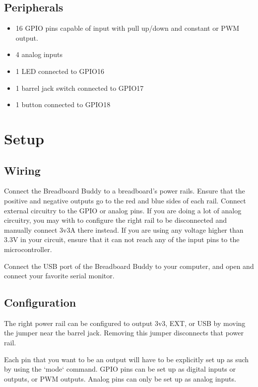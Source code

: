 \documentclass[12pt,letterpaper]{article}
\begin{document}
\subsection{Peripherals}
\begin{itemize}
    \item 16 GPIO pins capable of input with pull up/down and constant or PWM output.
    \item 4 analog inputs
    \item 1 LED connected to GPIO16
    \item 1 barrel jack switch connected to GPIO17
    \item 1 button connected to GPIO18
\end{itemize}

\section{Setup}

\subsection{Wiring}
Connect the Breadboard Buddy to a breadboard's power rails. Ensure that the positive and negative outputs go to the red and blue sides of each rail. Connect external circuitry to the GPIO or analog pins. If you are doing a lot of analog circuitry, you may with to configure the right rail to be disconnected and manually connect 3v3A there instead. If you are using any voltage higher than 3.3V in your circuit, ensure that it can not reach any of the input pins to the microcontroller.

Connect the USB port of the Breadboard Buddy to your computer, and open and connect your favorite serial monitor.

\subsection{Configuration}

The right power rail can be configured to output 3v3, EXT, or USB by moving the jumper near the barrel jack. Removing this jumper disconnects that power rail.

Each pin that you want to be an output will have to be explicitly set up as such by using the `mode` command. GPIO pins can be set up as digital inputs or outputs, or PWM outputs. Analog pins can only be set up as analog inputs.
\end{document}
